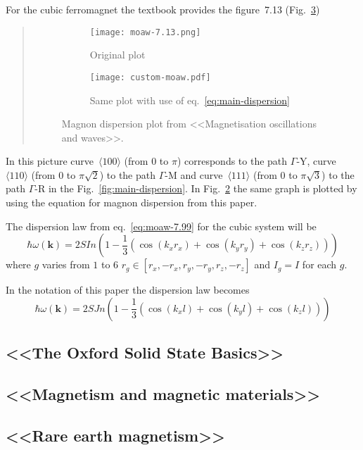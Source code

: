     For the cubic ferromagnet the textbook provides the figure~7.13 (Fig.~\ref{fig:moaw-7.13})
    \begin{quote}
        \begin{figure}[H]
            \centering
            \begin{subfigure}[b]{0.49\textwidth}
                \centering
                \texttt{[image: moaw-7.13.png]}
                \caption{Original plot}
                \label{fig:moaw-7.13-original}
            \end{subfigure}
            \hfill
            \begin{subfigure}[b]{0.49\textwidth}
                \centering
                \texttt{[image: custom-moaw.pdf]}
                \caption{Same plot with use of eq.~\eqref{eq:main-dispersion}}
                \label{fig:moaw-7.13-custom}
            \end{subfigure}
            \hfill
            \caption{Magnon dispersion plot from <<Magnetisation oscillations and waves>>.}
            \label{fig:moaw-7.13}
        \end{figure}
    \end{quote}
    In this picture curve~$\langle 100\rangle$ (from $0$ to $\pi$) corresponds to the path $\Gamma$-Y, 
    curve~$\langle 110\rangle$ (from $0$ to $\pi\sqrt{2}$) to the path $\Gamma$-M and
    curve~$\langle 111\rangle$ (from $0$ to $\pi\sqrt{3}$) to the path $\Gamma$-R 
    in the Fig.~\ref{fig:main-dispersion}. In Fig.~\ref{fig:moaw-7.13-custom} the same graph is plotted by using the equation for magnon dispersion from this paper.

    The dispersion law from eq.~\ref{eq:moaw-7.99} for the cubic system will be
    \begin{equation}
        \hbar\omega(\mathbf{k}) = 2SIn\left(1 - \dfrac{1}{3}\left(\cos(k_xr_x) + \cos(k_yr_y) + \cos(k_zr_z)\right)\right)
    \end{equation}
    where $g$ varies from $1$ to $6$ $r_g \in [r_x, -r_x, r_y, -r_y, r_z, -r_z]$ and $I_g = I$ for each $g$. 

    In the notation of this paper the dispersion law becomes
    \begin{equation}
        \hbar\omega(\mathbf{k}) = 2SJn\left(1 - \dfrac{1}{3}\left(\cos(k_xl) + \cos(k_yl) + \cos(k_zl)\right)\right)
    \end{equation}

\subsection{<<The Oxford Solid State Basics>>\cite{simon2013oxford}}

\subsection{<<Magnetism and magnetic materials>>\cite{coey2010magnetism}}

\subsection{<<Rare earth magnetism>>\cite{jensen1991rare}}



